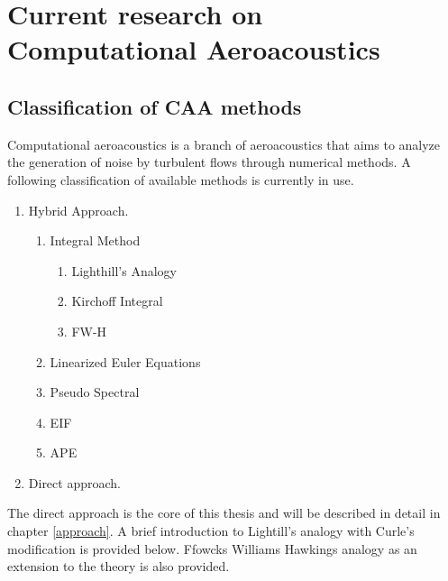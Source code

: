 
\chapter{Current research on Computational Aeroacoustics} %

\label{CAA} %


\section{Classification of CAA methods}
Computational aeroacoustics is a branch of aeroacoustics that aims to analyze the generation of noise by turbulent flows through numerical methods. A following classification of available methods is currently in use.

\begin{enumerate}
   \item Hybrid Approach.
   \begin{enumerate}
     \item Integral Method
     \begin{enumerate}
     	\item Lighthill's Analogy
     	\item Kirchoff Integral
     	\item FW-H
     \end{enumerate}
     \item Linearized Euler Equations
     \item Pseudo Spectral
     \item EIF
     \item APE
   \end{enumerate}
   \item Direct approach.
\end{enumerate}

The direct approach is the core of this thesis and will be described in detail in chapter \ref{approach}. A brief introduction to Lightill's analogy with Curle's modification is provided below. Ffowcks Williams Hawkings analogy as an extension to the theory is also provided.

